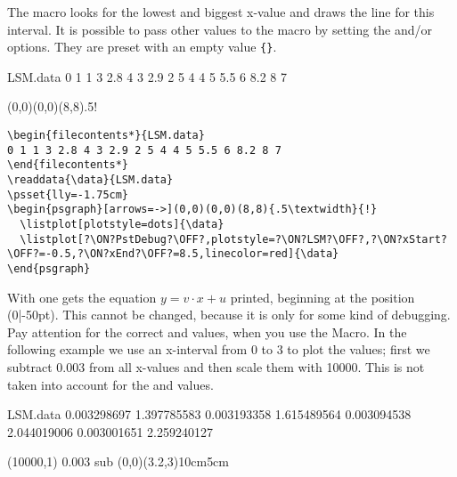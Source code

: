 \documentclass[11pt,english,BCOR10mm,DIV12,bibliography=totoc,parskip=false,smallheadings
    headexclude,footexclude,oneside,dvipsnames,svgnames]{pst-doc}
\begin{document}
The macro looks for the lowest and biggest x-value and draws the
line for this interval. It is possible to pass other values to the
macro by setting the  and/or  options.
They are preset with an empty value \verb+{}+.

\bgroup
\centering
\begin{filecontents*}{LSM.data}
0 1 1 3 2.8 4 3 2.9 2 5 4 4 5 5.5 6 8.2 8 7
\end{filecontents*}
\begin{psgraph}[arrows=->](0,0)(0,0)(8,8){.5\textwidth}{!}
  \listplot[plotstyle=dots]{\data}
  \listplot[PstDebug=1,plotstyle=LSM,xStart=-0.5,xEnd=8.5,linecolor=red]{\data}
\end{psgraph}
\egroup

\begin{lstlisting}
\begin{filecontents*}{LSM.data}
0 1 1 3 2.8 4 3 2.9 2 5 4 4 5 5.5 6 8.2 8 7
\end{filecontents*}
\readdata{\data}{LSM.data}
\psset{lly=-1.75cm}
\begin{psgraph}[arrows=->](0,0)(0,0)(8,8){.5\textwidth}{!}
  \listplot[plotstyle=dots]{\data}
  \listplot[?\ON?PstDebug?\OFF?,plotstyle=?\ON?LSM?\OFF?,?\ON?xStart?\OFF?=-0.5,?\ON?xEnd?\OFF?=8.5,linecolor=red]{\data}
\end{psgraph}
\end{lstlisting}


With  one gets the equation $y=v\cdot x+u$
printed, beginning at the position (0|-50pt). This cannot be
changed, because it is only for some kind of debugging. Pay
attention for the correct  and  values,
when you use the  Macro. In the following
example we use an x-interval from 0 to 3 to plot the values; first
we subtract 0.003 from all x-values and then scale them with
10000. This is not taken into account for the  and
 values.


\bgroup
\centering
\begin{filecontents*}{LSM.data}
0.003298697 1.397785583
0.003193358 1.615489564
0.003094538 2.044019006
0.003001651 2.259240127
\end{filecontents*}
\pstScalePoints(10000,1){ 0.003 sub }{}
\psgraph[arrows=->,Ox=0.0030,Dx=0.0001,dx=\psxunit](0,0)(3.2,3){10cm}{5cm}
  \listplot[showpoints=true,linewidth=1pt,linecolor=blue]{\data}
  \listplot[PstDebug=1,plotstyle=LSM,linewidth=0.1pt,linestyle=dashed,%
    xStart=-0.25,xEnd=3.3]{\data}
\endpsgraph
\egroup
\end{document}
